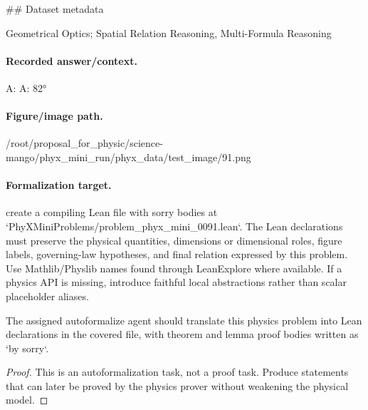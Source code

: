 \#\# Dataset metadata

Geometrical Optics; Spatial Relation Reasoning, Multi-Formula Reasoning

\paragraph{Recorded answer/context.}
A: A: 82°

\paragraph{Figure/image path.}
/root/proposal\_for\_physic/science-mango/phyx\_mini\_run/phyx\_data/test\_image/91.png

\paragraph{Formalization target.}
create a compiling Lean file with sorry bodies at `PhyXMiniProblems/problem\_phyx\_mini\_0091.lean`. The Lean declarations must preserve the physical quantities, dimensions or dimensional roles, figure labels, governing-law hypotheses, and final relation expressed by this problem.
Use Mathlib/Physlib names found through LeanExplore where available. If a physics API is missing, introduce faithful local abstractions rather than scalar placeholder aliases.

\begin{theorem}
\label{thm:physics:phyx_mini_0091:target}
The assigned autoformalize agent should translate this physics problem into Lean declarations in the covered file, with theorem and lemma proof bodies written as `by sorry`.
\end{theorem}
\begin{proof}
This is an autoformalization task, not a proof task. Produce statements that can later be proved by the physics prover without weakening the physical model.
\end{proof}

